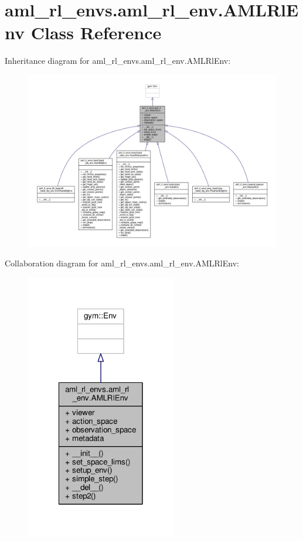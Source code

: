 \hypertarget{classaml__rl__envs_1_1aml__rl__env_1_1_a_m_l_rl_env}{\section{aml\-\_\-rl\-\_\-envs.\-aml\-\_\-rl\-\_\-env.\-A\-M\-L\-Rl\-Env Class Reference}
\label{classaml__rl__envs_1_1aml__rl__env_1_1_a_m_l_rl_env}
}


Inheritance diagram for aml\-\_\-rl\-\_\-envs.\-aml\-\_\-rl\-\_\-env.\-A\-M\-L\-Rl\-Env\-:
\nopagebreak
\begin{figure}[H]
\begin{center}
\leavevmode
\includegraphics[width=350pt]{classaml__rl__envs_1_1aml__rl__env_1_1_a_m_l_rl_env__inherit__graph}
\end{center}
\end{figure}


Collaboration diagram for aml\-\_\-rl\-\_\-envs.\-aml\-\_\-rl\-\_\-env.\-A\-M\-L\-Rl\-Env\-:
\nopagebreak
\begin{figure}[H]
\begin{center}
\leavevmode
\includegraphics[width=186pt]{classaml__rl__envs_1_1aml__rl__env_1_1_a_m_l_rl_env__coll__graph}
\end{center}
\end{figure}
